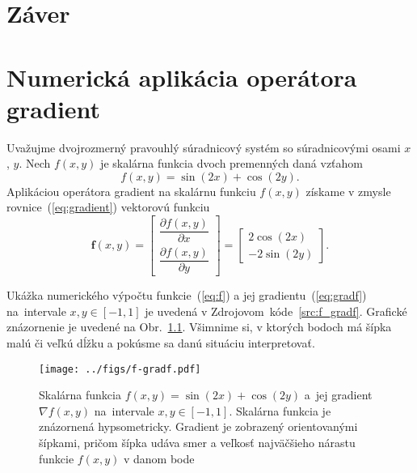 \documentclass[a4paper, 12pt]{book}
\let\vec\mathbf
\begin{document}
\chapter*{Záver}







\appendix
\chapter{Numerická aplikácia operátora gradient}
\label{app:numerical_application_of_gradient}

Uvažujme dvojrozmerný pravouhlý súradnicový systém so súradnicovými osami $x$, 
$y$.  Nech $f(x, y)$ je skalárna funkcia dvoch premenných daná vzťahom
%
\begin{equation}
\label{eq:f}
f(x, y) = \sin(2x) + \cos(2y){.}
\end{equation}
%
Aplikáciou operátora gradient na skalárnu funkciu $f(x, y)$ získame v zmysle 
rovnice~(\ref{eq:gradient}) vektorovú funkciu
%
\begin{equation}
\label{eq:gradf}
\vec f(x, y) =
\begin{bmatrix}
\dfrac{\partial f(x, y)}{\partial x} \\[2ex]
\dfrac{\partial f(x, y)}{\partial y}
\end{bmatrix}
=
\begin{bmatrix}
2 \cos(2x) \\[2ex]
-2 \sin(2y)
\end{bmatrix}
{.}
\end{equation}

Ukážka numerického výpočtu funkcie~(\ref{eq:f}) a jej 
gradientu~(\ref{eq:gradf}) na~intervale $x, y \in [-1, 1]$ je uvedená 
v Zdrojovom~kóde~\ref{src:f_gradf}.  Grafické znázornenie je uvedené na 
Obr.~\ref{fig:f_gradf}.  Všimnime si, v ktorých bodoch má šípka malú či veľkú 
dĺžku a pokúsme sa danú situáciu interpretovať.



\begin{figure}[bt]
\centering
\texttt{[image: ../figs/f-gradf.pdf]}
\caption{Skalárna funkcia $f(x, y) = \sin(2x) + \cos(2y)$ a~jej gradient 
$\nabla f(x, y)$ na~intervale $x, y \in [-1, 1]$.  Skalárna funkcia je 
znázornená hypsometricky.  Gradient je zobrazený orientovanými šípkami, pričom 
šípka udáva smer a veľkosť najväčšieho nárastu funkcie $f(x, y)$ v danom bode}
\label{fig:f_gradf}
\end{figure}




\end{document}
